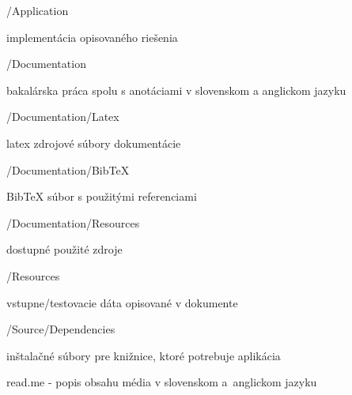 \begin{my_itemize}
\emptyitem /Application
	\begin{my_itemize}
	\myitem implementácia opisovaného riešenia
	\end{my_itemize}	
\emptyitem /Documentation
	\begin{my_itemize}
	\myitem bakalárska práca spolu s anotáciami v slovenskom a anglickom jazyku
	\end{my_itemize}
\emptyitem /Documentation/Latex
	\begin{my_itemize}
	\myitem latex zdrojové súbory dokumentácie
	\end{my_itemize}
\emptyitem /Documentation/BibTeX
	\begin{my_itemize}
	\myitem BibTeX súbor s použitými referenciami
	\end{my_itemize}
\emptyitem /Documentation/Resources
	\begin{my_itemize}
	\myitem dostupné použité zdroje
	\end{my_itemize}
\emptyitem /Resources
	\begin{my_itemize}
	\myitem vstupne/testovacie dáta opisované v dokumente
	\end{my_itemize}
\emptyitem /Source/Dependencies
	\begin{my_itemize}
	\myitem inštalačné súbory pre knižnice, ktoré potrebuje aplikácia
	\end{my_itemize}	
\emptyitem read.me	- popis obsahu média v slovenskom a~anglickom jazyku
\end{my_itemize}